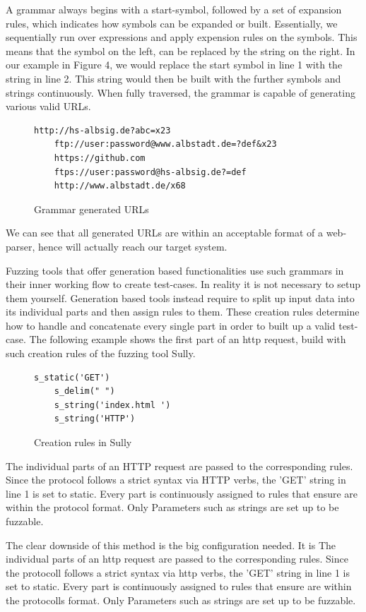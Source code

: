 \documentclass[journal=tosc,final]{iacrtrans}
\begin{document}
A grammar always begins with a start-symbol, followed by a set of expansion rules, which indicates how symbols can be expanded or built. 
Essentially, we sequentially run over expressions and apply expension rules on the symbols. This means that the symbol on the left, can be replaced by the string on the right. In our example in Figure 4, we would replace the start symbol in line 1 with the string in line 2. This string would then be built with the further symbols and strings continuously. When fully traversed, the grammar is capable of generating various valid URLs.
\begin{figure}[h]
 \caption{Grammar generated URLs}
 \begin{lstlisting}[style=code]
	http://hs-albsig.de?abc=x23
	ftp://user:password@www.albstadt.de=?def&x23
	https://github.com
	ftps://user:password@hs-albsig.de?=def
	http://www.albstadt.de/x68
 \end{lstlisting} 
\end{figure}
\newpage
We can see that all generated URLs are within an acceptable format of a web-parser, hence will actually reach our target system.

Fuzzing tools that offer generation based functionalities use such grammars in their inner working flow to create test-cases. In reality it is not necessary to setup them yourself. Generation based tools instead require to split up input data into its individual parts and then assign rules to them. These creation rules determine how to handle and concatenate every single part in order to built up a valid test-case. The following example shows the first part of an http request, build with such creation rules of the fuzzing tool Sully.
\begin{figure}[h]
 \caption{Creation rules in Sully}
 \begin{lstlisting}[style=code]
	s_static('GET')
	s_delim(" ")
	s_string('index.html ')
	s_string('HTTP')
 \end{lstlisting}
\end{figure}
The individual parts of an HTTP request are passed to the corresponding rules. Since the protocol follows a strict syntax via HTTP verbs, the 'GET' string in line 1 is set to static. Every part is continuously assigned to rules that ensure are within the protocol format. Only Parameters such as strings are set up to be fuzzable.
   
The clear downside of this method is the big configuration needed. It is The individual parts of an http request are passed to the corresponding rules. Since the protocoll follows a strict syntax via http verbs, the 'GET' string in line 1 is set to static. Every part is continuously assigned to rules that ensure are within the protocolls format. Only Parameters such as strings are set up to be fuzzable.
   
\end{document}
